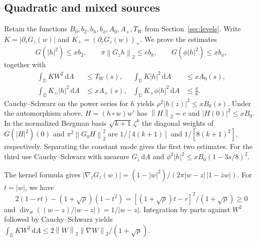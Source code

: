 \documentclass[11pt,a4paper,reqno]{amsart}
\theoremstyle{remark}
\numberwithin{equation}{section}
\newcommand{\dd}{\,\mathrm d}
\newcommand{\norm}[1]{\left\|#1\right\|_2}
\newcommand{\D}{\mathbb D}
\begin{document}
\subsection{Quadratic and mixed sources}
Retain the functions $B_0,b_2,b_h,b_\phi,A_0,A_+,T_W$ from
Section~\ref{sec:levels}. Write $K=|\partial_rG_z(w)|$ and
$K_+=(\partial_rG_z(w))_+$. We prove the estimates
\[
 G(|h|^2)\le x b_2,\qquad \pi\norm{G_z h}\le e b_h,\qquad
 G(\phi|h|^2)\le x b_\phi ,
\]
together with
\begin{equation}\label{eq:sources-all}\begin{aligned}
  \int_\D KW^2\dd A &\le T_W(s), &
  \int_\D K|h|^2\dd A &\le xA_0(s),\\
  \int_\D K_+|h|^2\dd A &\le xA_+(s), &
  \int_\D K_+\phi|h|^2\dd A &\le\frac{x}{6}.
\end{aligned}\end{equation}
Cauchy--Schwarz on the power series for $h$ yields
$\rho^2|h(z)|^2\le x B_0(s)$. Under the automorphism above,
$H=(h\circ w)w'$ has $\norm H=e$ and $|H(0)|^2\le xB_0$.
In the normalized Bergman basis $\sqrt{k+1}\,\zeta^k$ the diagonal
weights of $G(|H|^2)(0)$ and $\pi^2\norm{G_0H}^2$ are
$1/[4(k+1)]$ and $1/[8(k+1)^2]$, respectively. Separating the constant
mode gives the first two estimates. For the third use Cauchy--Schwarz
with measure $G_z\dd A$ and
$\phi^2|h|^2\le xB_0(1-3s/8)^2$.

The kernel formula gives
$|\nabla_zG_z(w)|=(1-|w|^2)/(2\pi|w-z|\,|1-\bar zw|)$.
For $t=|w|$, we have
\[
 2(1-rt)-(1+\sqrt\rho)(1-t^2)
 =[(1+\sqrt\rho)t-r]^2/(1+\sqrt\rho)\ge0
\]
and $\operatorname{div}_w((w-z)/|w-z|)=1/|w-z|$.
Integration by parts against $W^2$ followed by Cauchy--Schwarz yields
$\int_\D KW^2\dd A\le2\norm W\norm{\nabla W}/(1+\sqrt\rho)$.
\end{document}
